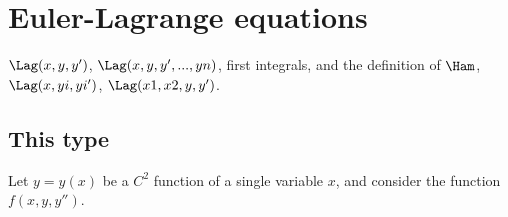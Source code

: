 \section{Euler-Lagrange equations}
$\Lag(x,y,y')$, $\Lag(x,y,y',...,yn)$, first integrals, and the definition of $\Ham$, $\Lag(x,yi,yi')$, $\Lag(x1,x2,y,y')$.

\subsection{This type}
Let $y=y(x)$ be a $C^{2}$ function of a single variable $x$, and consider the function $f(x, y, y'')$.